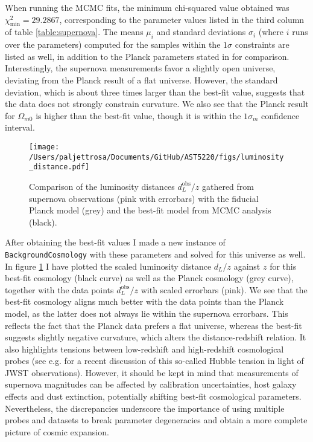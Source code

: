 \documentclass{aa}
\begin{document}
When running the MCMC fits, the minimum chi-squared value obtained was $\chi^2_\text{min}=29.2867$, corresponding to the parameter values listed in the third column of table \ref{table:supernova}. The means $\mu_i$ and standard deviations $\sigma_i$ (where $i$ runs over the parameters) computed for the samples within the $1\sigma$ constraints are listed as well, in addition to the Planck parameters stated in \cite{Planck} for comparison. Interestingly, the supernova measurements favor a slightly open universe, deviating from the Planck result of a flat universe. However, the standard deviation, which is about three times larger than the best-fit value, suggests that the data does not strongly constrain curvature. We also see that the Planck result for $\Omega_{m0}$ is higher than the best-fit value, though it is within the $1\sigma_m$ confidence interval. 

\begin{figure}
    \centering
    \texttt{[image: /Users/paljettrosa/Documents/GitHub/AST5220/figs/luminosity\_distance.pdf]}
    \caption{Comparison of the luminosity distances $d_L^\text{obs}/z$ gathered from supernova observations (pink with errorbars) with the fiducial Planck model (grey) and the best-fit model from MCMC analysis (black).}\label{fig:luminosity distance}
\end{figure}

After obtaining the best-fit values I made a new instance of \verb|BackgroundCosmology| with these parameters and solved for this universe as well. In figure \ref{fig:luminosity distance} I have plotted the scaled luminosity distance $d_L/z$ against $z$ for this best-fit cosmology (black curve) as well as the Planck cosmology (grey curve), together with the data points $d_L^\text{obs}/z$ with scaled errorbars (pink). We see that the best-fit cosmology aligns much better with the data points than the Planck model, as the latter does not always lie within the supernova errorbars. This reflects the fact that the Planck data prefers a flat universe, whereas the best-fit suggests slightly negative curvature, which alters the distance-redshift relation. It also highlights tensions between low-redshift and high-redshift cosmological probes (see e.g. \cite{JWST} for a recent discussion of this so-called Hubble tension in light of JWST observations). However, it should be kept in mind that measurements of supernova magnitudes can be affected by calibration uncertainties, host galaxy effects and dust extinction, potentially shifting best-fit cosmological parameters. Nevertheless, the discrepancies underscore the importance of using multiple probes and datasets to break parameter degeneracies and obtain a more complete picture of cosmic expansion.
\end{document}
